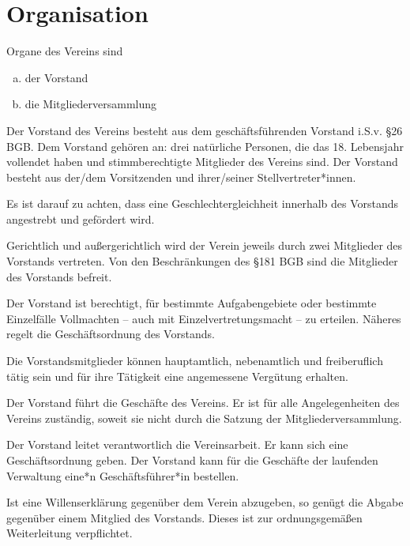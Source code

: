 \section{Organisation}
\begin{contract}

    Organe des Vereins sind
    \begin{enumerate}[(a)]
        \item der Vorstand
        \item die Mitgliederversammlung
    \end{enumerate}

    Der Vorstand des Vereins besteht aus dem geschäftsführenden Vorstand i.S.v. \S 26 BGB. Dem Vorstand gehören an: drei natürliche Personen, die das 18. Lebensjahr vollendet haben und stimmberechtigte Mitglieder des Vereins sind. Der Vorstand besteht aus der/dem Vorsitzenden und ihrer/seiner Stellvertreter*innen.

    Es ist darauf zu achten, dass eine Geschlechtergleichheit innerhalb des Vorstands angestrebt und gefördert wird.

    Gerichtlich und außergerichtlich wird der Verein jeweils durch zwei Mitglieder des Vorstands vertreten. Von den Beschränkungen des \S 181 BGB sind die Mitglieder des Vorstands befreit.

    Der Vorstand ist berechtigt, für bestimmte Aufgabengebiete oder bestimmte Einzelfälle Vollmachten – auch mit Einzelvertretungsmacht – zu erteilen. Näheres regelt die Geschäftsordnung des Vorstands.

    Die Vorstandsmitglieder können hauptamtlich, nebenamtlich und freiberuflich tätig sein und für ihre Tätigkeit eine angemessene Vergütung erhalten.

    Der Vorstand führt die Geschäfte des Vereins. Er ist für alle Angelegenheiten des Vereins zuständig, soweit sie nicht durch die Satzung der Mitgliederversammlung.

    Der Vorstand leitet verantwortlich die Vereinsarbeit. Er kann sich eine Geschäftsordnung geben. Der Vorstand kann für die Geschäfte der laufenden Verwaltung eine*n Geschäftsführer*in bestellen.

    Ist eine Willenserklärung gegenüber dem Verein abzugeben, so genügt die Abgabe gegenüber einem Mitglied des Vorstands. Dieses ist zur ordnungsgemäßen Weiterleitung verpflichtet.


\end{contract}
